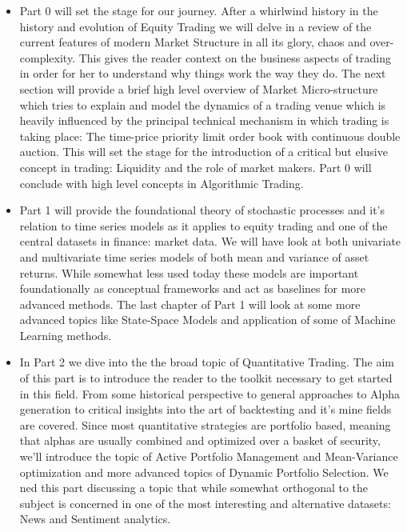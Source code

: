 \begin{itemize}
\item Part 0 will set the stage for our journey. After a whirlwind history in the history and evolution of Equity Trading we will delve in a review of the current features of modern Market Structure in all its glory, chaos and over-complexity. This gives the reader context on the business aspects of trading in order for her to understand why things work the way they do. The next section will provide a brief high level overview of Market Micro-structure which tries to explain and model the dynamics of a trading venue which is heavily influenced by the principal technical mechanism in which trading is taking place: The time-price priority limit order book with  continuous double auction. This will set the stage for the introduction of a critical but elusive concept in trading: Liquidity and the role of market makers. Part 0 will conclude with high level concepts in Algorithmic Trading.

\item Part 1  will provide the foundational theory of stochastic processes and it's relation to time series models as it applies to equity trading and one of the central datasets in finance: market data. We will have look at both univariate and multivariate time series models of both mean and variance of asset returns. While somewhat less used today these models are important foundationally as conceptual frameworks and act as baselines for more advanced methods. The last chapter of Part 1 will look at some more advanced topics like State-Space Models and application of some of Machine Learning methods.

\item In Part 2  we dive into the the broad topic of Quantitative Trading. The aim of this part is to introduce the reader to the toolkit necessary to get started in this field. From some historical perspective to general approaches to Alpha generation to critical insights into the art of backtesting and it's mine fields are covered. Since most quantitative strategies are portfolio based, meaning that alphas are usually  combined  and optimized over a basket of security, we'll introduce the topic of Active Portfolio Management and Mean-Variance optimization and more advanced topics of Dynamic Portfolio Selection. We ned this part discussing a topic that while somewhat orthogonal to the subject is concerned in one of the most interesting and alternative datasets: News and Sentiment analytics.


\end{itemize}
